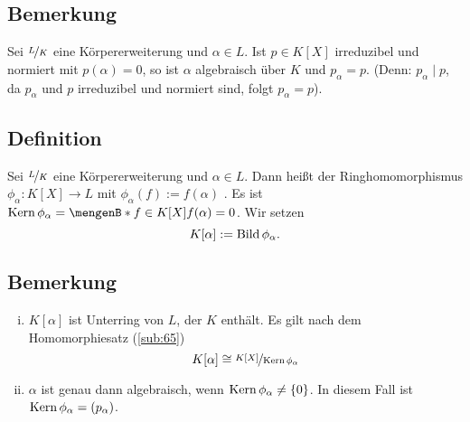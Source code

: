 \subsection[Bemerkung: Irreduzible, normierte Polynome mit $\alpha$ als Nullstelle sind direkt $p_\alpha$]{Bemerkung} %
\label{sub:1119}
Sei $\nicefrac{L}{K}$ eine Körpererweiterung und $\alpha \in L$. Ist $p \in K[X]$ irreduzibel und normiert mit $p(\alpha)=0$, so ist $\alpha$ algebraisch über $K$ und 
$p_\alpha=p$. (Denn: $p_\alpha \mid p$, da $p_\alpha $ und $p$ irreduzibel und normiert sind, folgt $p_\alpha =p$).

\subsection[Definition: Einsetzungshomomorphismus]{Definition} %
\label{sub:1120}
Sei $\nicefrac{L}{K}$ eine Körpererweiterung und $\alpha \in L$. Dann heißt der Ringhomomorphismus $\phi_\alpha : K[X] \to L$ mit $\phi_\alpha (f) := f(\alpha)$
. Es ist $\Kern \phi_\alpha = \set[{f \in K[X]}]{f(\alpha)=0}$. Wir setzen 
\[
	K[\alpha] := \operatorname{Bild} \phi_\alpha.
\]

\subsection[Bemerkung über $\Kern \Phi_\alpha$]{Bemerkung} %
\label{sub:1121}
\begin{enumerate}[(i)]
	\item $K[\alpha]$ ist Unterring von $L$, der $K$ enthält. Es gilt nach dem Homomorphiesatz (\ref{sub:65})
	\[
		K[\alpha] \cong \nicefrac{K[X]}{\operatorname{Kern} \phi_\alpha}
	\]
	\item $\alpha$ ist genau dann algebraisch, wenn $\operatorname{Kern} \phi_\alpha \not= \{0\}$. In diesem Fall ist $\operatorname{Kern} \phi_\alpha= (p_\alpha)$.
\end{enumerate}

